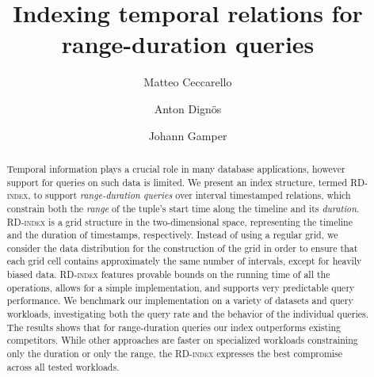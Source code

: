 \documentclass[sigconf,nonacm,anonymous]{acmart}
\theoremstyle{definition}
\newcommand{\algo}[1]{\textsc{#1}}
\newcommand{\rd}{\algo{RD-index}\xspace}
\begin{document}
\sloppy

\title{Indexing temporal relations for range-duration queries}

\author{Matteo Ceccarello}

\author{Anton Dign\"os}

\author{Johann Gamper}


\begin{abstract}
  Temporal information plays a crucial role in many database
  applications, however support for queries on such data is limited.
  We present an index structure, termed \rd, to support
  \emph{range-duration queries} over interval timestamped relations,
  which constrain both the \emph{range} of the tuple's start time
  along the timeline and its \emph{duration}.  \rd is a grid structure
  in the two-dimensional space, representing the timeline and the
  duration of timestamps, respectively.  Instead of using a regular
  grid, we consider the data distribution for the construction of the
  grid in order to ensure that each grid cell contains approximately
  the same number of intervals, except for heavily biased data.  \rd
  features provable bounds on the running time of all the operations,
  allows for a simple implementation, and supports very predictable
  query performance.
  We benchmark our implementation on a variety of datasets and query
  workloads, investigating both the query rate and the behavior of the
  individual queries.  The results shows that for range-duration
  queries our index outperforms existing competitors.  While other
  approaches are faster on specialized workloads constraining only the
  duration or only the range, the \rd expresses the best compromise
  across all tested workloads.
\end{abstract}

\maketitle
\end{document}
